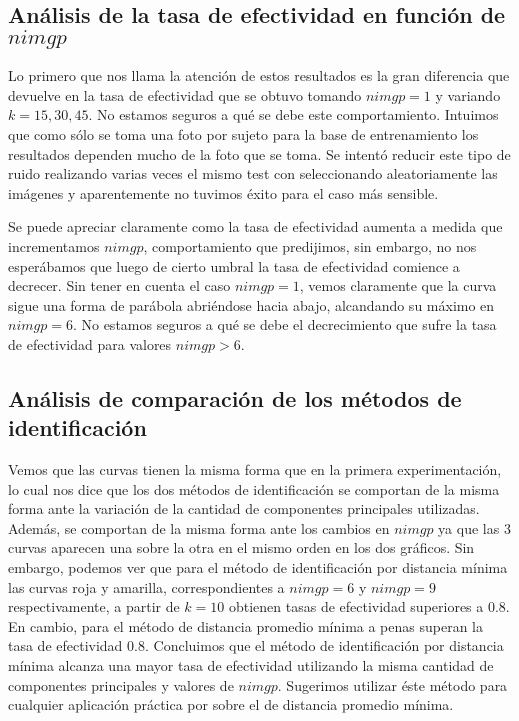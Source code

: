 \subsection{Análisis de la tasa de efectividad en función de $nimgp$}
Lo primero que nos llama la atención de estos resultados es la gran diferencia que devuelve en la tasa de efectividad que se obtuvo
tomando $nimgp = 1$ y variando $k = 15, 30, 45$. No estamos seguros a qué se debe este comportamiento. Intuimos que como sólo se toma
una foto por sujeto para la base de entrenamiento los resultados dependen mucho de la foto que se toma. Se intentó reducir este tipo
de ruido realizando varias veces el mismo test con seleccionando aleatoriamente las imágenes y aparentemente no tuvimos éxito para
el caso más sensible.
\par
Se puede apreciar claramente como la tasa de efectividad aumenta a medida que incrementamos $nimgp$, comportamiento que predijimos, sin embargo,
no nos esperábamos que luego de cierto umbral la tasa de efectividad comience a decrecer. Sin tener en cuenta el caso $nimgp = 1$, vemos 
claramente que la curva sigue una forma de parábola abriéndose hacia abajo, alcandando su máximo en $nimgp = 6$. No estamos seguros
a qué se debe el decrecimiento que sufre la tasa de efectividad para valores $nimgp > 6$.

\subsection{Análisis de comparación de los métodos de identificación}
Vemos que las curvas tienen la misma forma que en la primera experimentación, lo cual nos dice que los dos métodos de identificación
se comportan de la misma forma ante la variación de la cantidad de componentes principales utilizadas. Además, se comportan de la misma
forma ante los cambios en $nimgp$ ya que las 3 curvas aparecen una sobre la otra en el mismo orden en los dos gráficos. Sin embargo, 
podemos ver que para el método de identificación por distancia mínima las curvas roja y amarilla, correspondientes a $nimgp = 6$ y $nimgp = 9$
respectivamente, a partir de $k = 10$ obtienen tasas de efectividad superiores a $0.8$. En cambio, para el método de distancia promedio mínima
a penas superan la tasa de efectividad $0.8$. Concluimos que el método de identificación por distancia mínima alcanza una mayor tasa de 
efectividad utilizando la misma cantidad de componentes principales y valores de $nimgp$. Sugerimos utilizar éste método para cualquier
aplicación práctica por sobre el de distancia promedio mínima.

